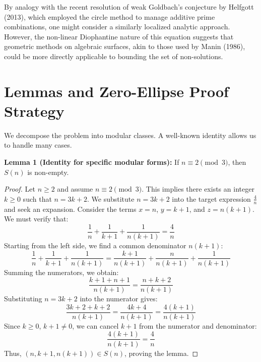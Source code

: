 \documentclass[12pt]{article}
\begin{document}
By analogy with the recent resolution of weak Goldbach's conjecture by Helfgott (2013), which employed the circle method to manage additive prime combinations, one might consider a similarly localized analytic approach. However, the non-linear Diophantine nature of this equation suggests that geometric methods on algebraic surfaces, akin to those used by Manin (1986), could be more directly applicable to bounding the set of non-solutions.

\section{Lemmas and Zero-Ellipse Proof Strategy}

We decompose the problem into modular classes. A well-known identity allows us to handle many cases.

\textbf{Lemma 1 (Identity for specific modular forms):} If $n \equiv 2 \pmod{3}$, then $S(n)$ is non-empty.

\begin{proof}
Let $n \ge 2$ and assume $n \equiv 2 \pmod{3}$. This implies there exists an integer $k \ge 0$ such that $n = 3k + 2$.
We substitute $n = 3k + 2$ into the target expression $\frac{4}{n}$ and seek an expansion.
Consider the terms $x = n$, $y = k+1$, and $z = n(k+1)$. We must verify that:
\begin{equation}
\frac{1}{n} + \frac{1}{k+1} + \frac{1}{n(k+1)} = \frac{4}{n}
\end{equation}
Starting from the left side, we find a common denominator $n(k+1)$:
\begin{equation}
\frac{1}{n} + \frac{1}{k+1} + \frac{1}{n(k+1)} = \frac{k+1}{n(k+1)} + \frac{n}{n(k+1)} + \frac{1}{n(k+1)}
\end{equation}
Summing the numerators, we obtain:
\begin{equation}
\frac{k+1 + n + 1}{n(k+1)} = \frac{n + k + 2}{n(k+1)}
\end{equation}
Substituting $n = 3k + 2$ into the numerator gives:
\begin{equation}
\frac{3k + 2 + k + 2}{n(k+1)} = \frac{4k + 4}{n(k+1)} = \frac{4(k+1)}{n(k+1)}
\end{equation}
Since $k \ge 0$, $k+1 \neq 0$, we can cancel $k+1$ from the numerator and denominator:
\begin{equation}
\frac{4(k+1)}{n(k+1)} = \frac{4}{n}
\end{equation}
Thus, $(n, k+1, n(k+1)) \in S(n)$, proving the lemma.
\end{proof}
\end{document}
